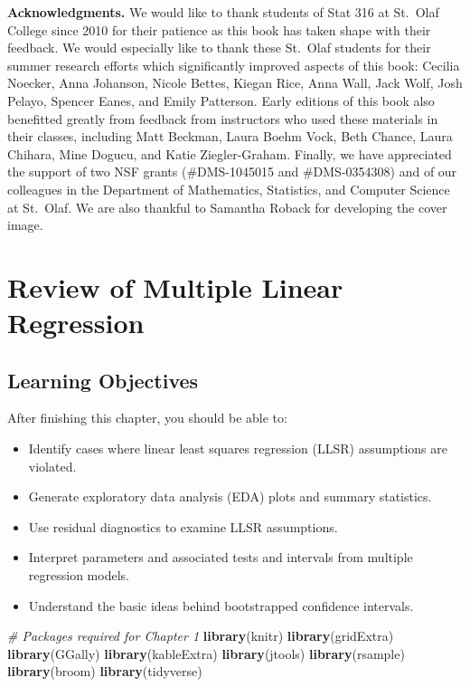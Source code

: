 \documentclass[
]{krantz}
\newenvironment{Shaded}{\begin{snugshade}}{\end{snugshade}}
\newcommand{\CommentTok}[1]{\textcolor[rgb]{0.37,0.37,0.37}{\textit{#1}}}
\newcommand{\KeywordTok}[1]{\textcolor[rgb]{0.27,0.27,0.27}{\textbf{#1}}}
\newcommand{\NormalTok}[1]{#1}
\providecommand{\tightlist}{%
  \setlength{\itemsep}{0pt}\setlength{\parskip}{0pt}}
\begin{document}
\textbf{Acknowledgments.} We would like to thank students of Stat 316 at St.~Olaf College since 2010 for their patience as this book has taken shape with their feedback. We would especially like to thank these St.~Olaf students for their summer research efforts which significantly improved aspects of this book: Cecilia Noecker, Anna Johanson, Nicole Bettes, Kiegan Rice, Anna Wall, Jack Wolf, Josh Pelayo, Spencer Eanes, and Emily Patterson. Early editions of this book also benefitted greatly from feedback from instructors who used these materials in their classes, including Matt Beckman, Laura Boehm Vock, Beth Chance, Laura Chihara, Mine Dogucu, and Katie Ziegler-Graham. Finally, we have appreciated the support of two NSF grants (\#DMS-1045015 and \#DMS-0354308) and of our colleagues in the Department of Mathematics, Statistics, and Computer Science at St.~Olaf. We are also thankful to Samantha Roback for developing the cover image.

\mainmatter

\hypertarget{ch-MLRreview}{%
\chapter{Review of Multiple Linear Regression}\label{ch-MLRreview}}

\hypertarget{learning-objectives}{%
\section{Learning Objectives}\label{learning-objectives}}

After finishing this chapter, you should be able to:

\begin{itemize}
\tightlist
\item
  Identify cases where linear least squares regression (LLSR) assumptions are violated.
\item
  Generate exploratory data analysis (EDA) plots and summary statistics.
\item
  Use residual diagnostics to examine LLSR assumptions.
\item
  Interpret parameters and associated tests and intervals from multiple regression models.
\item
  Understand the basic ideas behind bootstrapped confidence intervals.
\end{itemize}

\begin{Shaded}
\begin{Highlighting}[]
\CommentTok{# Packages required for Chapter 1}
\KeywordTok{library}\NormalTok{(knitr) }
\KeywordTok{library}\NormalTok{(gridExtra)}
\KeywordTok{library}\NormalTok{(GGally)}
\KeywordTok{library}\NormalTok{(kableExtra)}
\KeywordTok{library}\NormalTok{(jtools)}
\KeywordTok{library}\NormalTok{(rsample)}
\KeywordTok{library}\NormalTok{(broom)}
\KeywordTok{library}\NormalTok{(tidyverse)    }
\end{Highlighting}
\end{Shaded}
\end{document}
